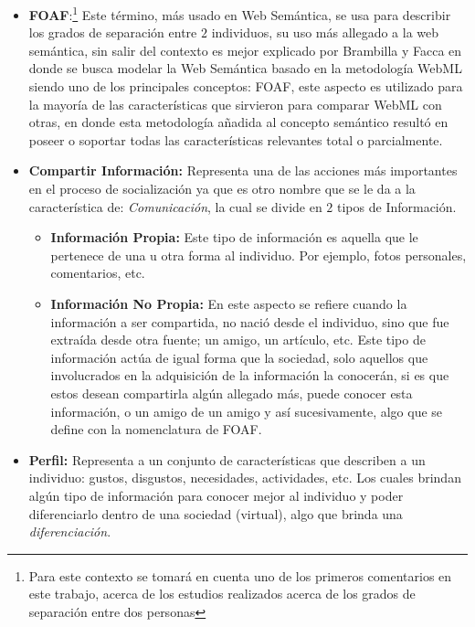 \documentclass[oneside,12pt,a4paper]{memoir}%
\begin{document}
\begin{enumerate}
	  	\begin{itemize}
			\item \textbf{\ac{FOAF}}:\footnote{Para este contexto se tomar\'a en cuenta
			uno de los primeros comentarios en este trabajo, acerca de los estudios
			realizados acerca de los grados de separaci\'on entre dos personas} Este
			t\'ermino, m\'as usado en Web Sem\'antica, se usa para describir los grados de
			separaci\'on entre $2$ individuos, su uso m\'as allegado a la web sem\'antica,
			sin salir del contexto es mejor explicado por Brambilla y Facca en
			\cite{Brambilla2007} donde se busca modelar la Web Sem\'antica basado en la
			metodolog\'ia \ac{WebML} siendo uno de los principales conceptos: \ac{FOAF},
			este aspecto es utilizado para la mayor\'ia de las caracter\'isticas que
			sirvieron para comparar \ac{WebML} con otras, en donde esta metodolog\'ia
			a\~nadida al concepto sem\'antico result\'o en poseer o soportar todas las
			caracter\'isticas relevantes total o parcialmente.
			\item \textbf{Compartir Informaci\'on:} Representa una de las acciones m\'as
			importantes en el proceso de socializaci\'on ya que es otro nombre que se le
			da a la caracter\'istica de: \textit{Comunicaci\'on}, la cual se divide en
			$2$ tipos de Informaci\'on.
			\begin{itemize}
				\item \textbf{Informaci\'on Propia:} Este tipo de informaci\'on es aquella
				que le pertenece de una u otra forma al individuo. Por ejemplo, fotos
				personales, comentarios, etc.
				\item \textbf{Informaci\'on No Propia:} En este aspecto se refiere cuando la
				informaci\'on a ser compartida, no naci\'o desde el individuo, sino que fue
				extra\'ida desde otra fuente; un amigo, un art\'iculo, etc. Este tipo de
				informaci\'on act\'ua de igual forma que la sociedad, solo aquellos que
				involucrados en la adquisici\'on de la informaci\'on la conocer\'an, si es
				que estos desean compartirla alg\'un allegado m\'as, puede conocer esta
				informaci\'on, o un amigo de un amigo y as\'i sucesivamente, algo que se
				define con la nomenclatura de \ac{FOAF}.
			\end{itemize}
			\item \textbf{Perfil:} Representa a un conjunto de caracter\'isticas que
			describen a un individuo: gustos, disgustos, necesidades, actividades, etc.
			Los cuales brindan alg\'un tipo de informaci\'on para conocer mejor al
			individuo y poder diferenciarlo dentro de una sociedad (virtual), algo que
			brinda una \textit{diferenciaci\'on}.
		\end{itemize}
		

\end{enumerate}
\end{document}
